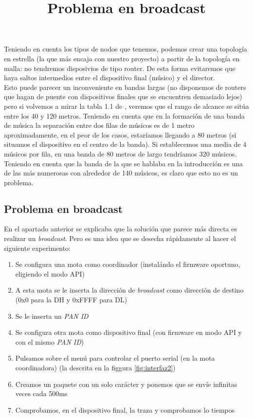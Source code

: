 Teniendo en cuenta los tipos de nodos que tenemos, podemos crear una topología en estrella
(la que más encaja con nuestro proyecto) a partir de la topología en malla: no tendremos
disposivios de tipo router. De esta forma evitaremos que haya saltos intermedios entre
el dispositivo final (músico) y el director.\\

Esto puede parecer un inconveniente en bandas largas (no disponemos de routers
que hagan de puente con dispositivos finales que se encuentren demasiado lejos)
pero si volvemos a mirar la tabla 1.1 de \cite{faludi}, veremos que el rango
de alcance se sitúa entre los 40 y 120 metros. Teniendo en cuenta que en la
formación de una banda de música la separación entre dos filas de músicos es de
1 metro aproximadamente, en el peor de los casos, estaríamos llegando a 80 metros
(si situamos el dispositivo en el centro de la banda). Si establecemos una media de
4 músicos por fila, en una banda de 80 metros de largo tendríamos 320 músicos.
Teniendo en cuenta que la banda de la que se hablaba en la introducción \cite{cigarreras}
es una de las más numerosas con alrededor de 140 músicos, es claro que esto no es
un problema.\\

\subsection{Problema en broadcast}
\title{Problema en broadcast}

En el apartado anterior se explicaba que la solución que parece más directa es realizar
un \textit{broadcast}. Pero es una idea que se desecha rápidamente al hacer el siguiente experimento:

\begin{enumerate}
  \item Se configura una mota como coordinador (instalándo el firmware oportuno, eligiendo el modo API)
  \item A esta mota se le inserta la dirección de \textit{broadcast} como
  dirección de destino (0x0 para la DH y 0xFFFF para DL)
  \item Se le inserta un \textit{PAN ID}
  \item Se configura otra mota como dispositivo final (con firmware en modo API
  y con el mismo \textit{PAN ID})
  \item Pulsamos sobre el menú para controlar el puerto serial (en la mota coordinadora)
  (la descrita en la figgura \ref{fig:interfaz2})
  \item Creamos un paquete con un solo carácter y ponemos que se envíe infinitas veces
  cada 500ms
  \item Comprobamos, en el dispositivo final, la traza y comprobamos lo tiempos
\end{enumerate}

